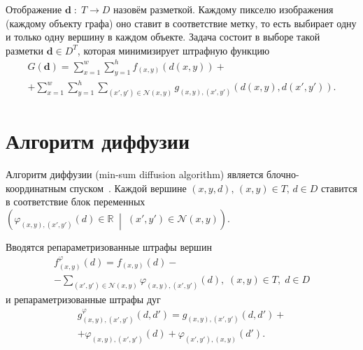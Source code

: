 \documentclass{ConfFTI}
\begin{document}
Отображение $\pmb{d} \; : \; T \to D$ назовём разметкой.
Каждому пикселю изображения (каждому объекту графа) оно
ставит в соответствие метку,
то есть выбирает одну и только одну вершину в каждом объекте.
Задача состоит в выборе такой разметки $\pmb{d} \in D^T$,
которая минимизирует штрафную функцию
\begin{equation}\label{eq:penalty}
\begin{gathered}
    G \left( \pmb{d} \right) =
    \sum \limits_{x = 1}^w
        \sum \limits_{y = 1}^h
            f_{\left(x, y \right)} \left(d \left(x, y \right) \right) + \\
    + \sum \limits_{x = 1}^w
        \sum \limits_{y = 1}^h
            \sum \limits_{\left(x', y' \right) \in \mathcal{N}\left(x, y \right)}
                g_{\left(x, y \right), \left(x', y'\right)} \left(
                    d \left(x, y \right), d\left(x', y' \right)
                \right).
\end{gathered}
\end{equation}

\section{Алгоритм диффузии}

Алгоритм диффузии (min-sum diffusion algorithm)
является блочно-координатным спуском~\cite{savchynskyy}.
Каждой вершине $\left(x, y, d \right), \, \left(x, y \right) \in T, \, d \in D$
ставится в соответствие блок переменных
$\left(
    \varphi_{ \left(x, y \right), \left(x', y'\right)} \left(d \right)
        \in \mathbb{R} \; \middle| \;
    \left(x', y' \right) \in \mathcal{N}\left(x, y \right)
\right)$.

Вводятся репараметризованные штрафы вершин
\begin{equation*}
\begin{gathered}
    f_{\left(x, y \right)}^{\varphi} \left(d\right) =
    f_{\left(x, y \right)} \left(d \right) - \\
    - \sum \limits_{\left(x', y'\right) \in \mathcal{N}\left(x, y \right)}
        \varphi_{\left(x, y \right), \left(x', y'\right)}\left(d \right), \;
    \left(x, y \right) \in T, \;
    d \in D
\end{gathered}
\end{equation*}
и репараметризованные штрафы дуг
\begin{equation*}
\begin{gathered}
    g_{\left(x, y \right), \left(x', y'\right)}^{\varphi} \left(d, d' \right) =
    g_{\left(x, y \right), \left(x', y'\right)} \left(d, d' \right) + \\
    + \varphi_{\left(x, y \right), \left(x', y' \right)} \left(d\right) +
    \varphi_{\left(x', y' \right), \left(x, y \right)} \left(d'\right).
\end{gathered}
\end{equation*}
\end{document}
